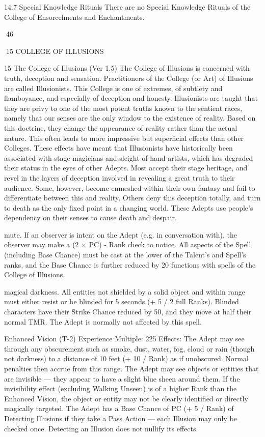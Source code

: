 \documentclass[a4paper]{article}
\begin{document}
\begin{multicols}{3}
14.7 Special Knowledge Rituals
There are no Special Knowledge Rituals of the
College of Ensorcelments and Enchantments.

46

15 COLLEGE OF ILLUSIONS

15 The College of Illusions (Ver 1.5)
The College of Illusions is concerned with truth,
deception and sensation. Practitioners of the College (or Art) of Illusions are called Illusionists.
This College is one of extremes, of subtlety and
flamboyance, and especially of deception and
honesty. Illusionists are taught that they are privy
to one of the most potent truths known to the sentient races, namely that our senses are the only
window to the existence of reality. Based on this
doctrine, they change the appearance of reality
rather than the actual nature. This often leads to
more impressive but superficial effects than other
Colleges. These effects have meant that Illusionists
have historically been associated with stage magicians and sleight-of-hand artists, which has degraded their status in the eyes of other Adepts.
Most accept their stage heritage, and revel in the
layers of deception involved in revealing a great
truth to their audience. Some, however, become
enmeshed within their own fantasy and fail to
differentiate between this and reality. Others deny
this deception totally, and turn to death as the only
fixed point in a changing world. These Adepts use
people’s dependency on their senses to cause death
and despair.

mute. If an observer is intent on the Adept (e.g. in
conversation with), the observer may make a (2 ×
PC) - Rank check to notice. All aspects of the Spell
(including Base Chance) must be cast at the lower
of the Talent’s and Spell’s ranks, and the Base
Chance is further reduced by 20%
functions with spells of the College of Illusions.

magical darkness. All entities not shielded by a
solid object and within range must either resist or
be blinded for 5 seconds (+ 5 / 2 full Ranks).
Blinded characters have their Strike Chance reduced by 50, and they move at half their normal
TMR. The Adept is normally not affected by this
spell.

Enhanced Vision (T-2)
Experience Multiple: 225
Effects: The Adept may see through any obscurement such as smoke, dust, water, fog, cloud or rain
(though not darkness) to a distance of 10 feet (+ 10
/ Rank) as if unobscured. Normal penalties then
accrue from this range. The Adept may see objects
or entities that are invisible — they appear to have
a slight blue sheen around them. If the invisibility
effect (excluding Walking Unseen) is of a higher
Rank than the Enhanced Vision, the object or entity may not be clearly identified or directly magically targeted. The Adept has a Base Chance of PC
(+ 5 / Rank) of Detecting Illusions if they take a
Pass Action — each Illusion may only be checked
once. Detecting an Illusion does not nullify its
effects.


\end{multicols}
\end{document}

